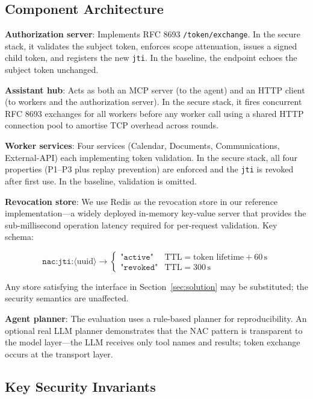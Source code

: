 \documentclass[journal]{IEEEtran}
\begin{document}
\subsection{Component Architecture}

\textbf{Authorization server}: Implements RFC 8693 \texttt{/token/exchange}.
In the secure stack, it validates the subject token, enforces scope attenuation,
issues a signed child token, and registers the new \texttt{jti}. In the baseline,
the endpoint echoes the subject token unchanged.

\textbf{Assistant hub}: Acts as both an MCP server (to the agent) and an HTTP
client (to workers and the authorization server). In the secure stack, it fires
concurrent RFC 8693 exchanges for all workers before any worker call using a
shared HTTP connection pool to amortise TCP overhead across rounds.

\textbf{Worker services}: Four services (Calendar, Documents, Communications,
External-API) each implementing token validation. In the secure stack, all four
properties (P1--P3 plus replay prevention) are enforced and the \texttt{jti} is
revoked after first use. In the baseline, validation is omitted.

\textbf{Revocation store}: We use Redis \cite{redis} as the revocation store
in our reference implementation---a widely deployed in-memory key-value server
that provides the sub-millisecond operation latency required for per-request
validation. Key schema:

\begin{equation}
\texttt{nac:jti:}\langle\text{uuid}\rangle \to
\begin{cases}
  \texttt{"active"}  & \text{TTL} = \text{token lifetime} + 60\,\text{s} \\
  \texttt{"revoked"} & \text{TTL} = 300\,\text{s}
\end{cases}
\end{equation}

Any store satisfying the interface in Section~\ref{sec:solution} may be
substituted; the security semantics are unaffected.

\textbf{Agent planner}: The evaluation uses a rule-based planner for
reproducibility. An optional real LLM planner demonstrates that the NAC pattern
is transparent to the model layer---the LLM receives only tool names and results;
token exchange occurs at the transport layer.

\subsection{Key Security Invariants}
\end{document}
